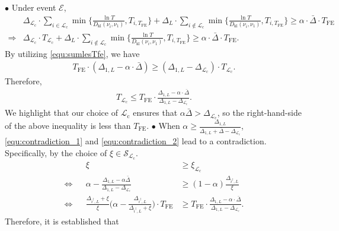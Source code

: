 \documentclass[twoside,11pt]{article}
\newcommand{\kl}{D_{\mathrm{kl}}}
\newcommand{\calE}{\mathcal{E}}
\newcommand{\calL}{\mathcal{L}}
\newcommand{\calS}{\mathcal{S}}
\newcommand{\rmc}{\mathrm{c}}
\newcommand{\Tfe}{T_{\mathrm{FE}}}
\newcommand{\idagger}{{i^{\dagger}}}
\newcommand{\barDelta}{\bar{\Delta}}
\begin{document}
$\bullet$ Under event $\calE$,
\begin{align}
    &
    \Delta_{\calL_{\rmc}}\cdot \sum_{i\in\calL_{\rmc}} \min\bigg\{\frac{\ln T}{\kl(\nu_{i},\nu_1)}, T_{i,\Tfe}\bigg\}
    +
    \Delta_{L}\cdot \sum_{i\notin\calL_{\rmc}} \min\bigg\{\frac{\ln T}{\kl(\nu_{i},\nu_1)}, T_{i,\Tfe}\bigg\}
    \geq
    \alpha\cdot \barDelta\cdot \Tfe
    \\
    \Rightarrow&
    \Delta_{\calL_{\rmc}}\cdot 
    T_{\calL_{\rmc}}
    +
    \Delta_{L}\cdot \sum_{i\notin\calL_{\rmc}} \min\bigg\{\frac{\ln T}{\kl(\nu_{i},\nu_1)}, T_{i,\Tfe}\bigg\}
    \geq
    \alpha\cdot \barDelta\cdot \Tfe.
\end{align}
By utilizing \eqref{equ:sumlesTfe},
we have
\begin{align}
    \Tfe \cdot (\Delta_{1,L}-\alpha\cdot \barDelta )
    \geq
    (\Delta_{1,L}-\Delta_{\calL_{\rmc}})\cdot T_{\calL_{\rmc}}.
\end{align}
Therefore,
\begin{align}\label{equ:contradiction_2}
    T_{\calL_{\rmc}}
    \leq 
    \Tfe \cdot \frac{\Delta_{1,L}-\alpha\cdot \barDelta}{ \Delta_{1,L}-\Delta_{\calL_{\rmc}}}.
\end{align}
We highlight that our choice of $\calL_{\rmc}$ ensures that $\alpha\barDelta>\Delta_{\calL_{\rmc}}$, so the right-hand-side of the above inequality is less than $\Tfe$.
\newline
$\bullet$ When $\alpha\geq \frac{\Delta_{1,L}}{\Delta_{1,L}+\barDelta-\Delta_{\calL_{\rmc}}}$, \eqref{equ:contradiction_1} and \eqref{equ:contradiction_2} lead to a contradiction. Specifically, by the choice of $\xi\in\calS_{\calL_{\rmc}}$.
\begin{align}
    &&\xi
    &\geq 
    \xi_{\calL_{\rmc}}
    \\
    \Leftrightarrow&&
    \alpha-\frac{\Delta_{1,L}-\alpha\barDelta}{\Delta_{1,L}-\Delta_{\calL_{\rmc}}}
    &\geq 
    (1-\alpha)\frac{\Delta_{\idagger,L}}{\xi}
    \\
    \Leftrightarrow&&
    \frac{\Delta_{\idagger,L}+\xi}{\xi } \Big(\alpha-  \frac{\Delta_{\idagger,L}}{\Delta_{\idagger,L}+\xi }\Big)\cdot \Tfe
    &\geq
    \Tfe \cdot \frac{\Delta_{1,L}-\alpha\cdot \barDelta}{ \Delta_{1,L}-\Delta_{\calL_{\rmc}}}
    .\label{equ:epsilonthr}
\end{align}
Therefore, it is established that
\end{document}
